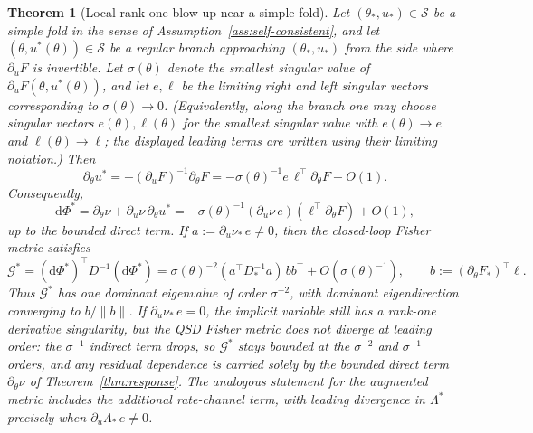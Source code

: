 \documentclass[11pt,reqno]{amsart}
\theoremstyle{plain}
\newtheorem{theorem}{Theorem}[section]
\theoremstyle{definition}
\theoremstyle{remark}
\newcommand{\dd}{\mathrm{d}}
\begin{document}
\begin{theorem}[Local rank-one blow-up near a simple fold]\label{thm:fold}
Let $(\theta_*,u_*)\in\mathcal S$ be a simple fold in the sense of
Assumption~\ref{ass:self-consistent}, and let $(\theta,u^{*}(\theta))\in\mathcal S$
be a regular branch approaching $(\theta_*,u_*)$ from the side where $\partial_uF$
is invertible. Let $\sigma(\theta)$ denote the smallest singular value of
$\partial_uF(\theta,u^{*}(\theta))$, and let $e,\ell$ be the limiting right and left
singular vectors corresponding to $\sigma(\theta)\to0$. \textup{(}Equivalently,
along the branch one may choose singular vectors $e(\theta),\ell(\theta)$ for the
smallest singular value with $e(\theta)\to e$ and $\ell(\theta)\to\ell$; the
displayed leading terms are written using their limiting notation.\textup{)} Then
\[
\partial_\theta u^{*}
=
-(\partial_uF)^{-1}\partial_\theta F
=
-\sigma(\theta)^{-1}e\,\ell^{\top}\partial_\theta F+O(1).
\]
Consequently,
\begin{equation}\label{eq:closed-loop}
\dd\Phi^{*}
=
\partial_\theta\nu+\partial_u\nu\,\partial_\theta u^{*}
=
-\sigma(\theta)^{-1}(\partial_u\nu\,e)(\ell^{\top}\partial_\theta F)+O(1),
\end{equation}
up to the bounded direct term. If $a:=\partial_u\nu_*\,e\neq0$, then the closed-loop
Fisher metric satisfies
\[
\mathcal G^{*}
=
(\dd\Phi^{*})^{\top}D^{-1}(\dd\Phi^{*})
=
\sigma(\theta)^{-2}(a^{\top}D_*^{-1}a)\,bb^{\top}+O(\sigma(\theta)^{-1}),
\qquad
b:=(\partial_\theta F_*)^{\top}\ell.
\]
Thus $\mathcal G^{*}$ has one dominant eigenvalue of order $\sigma^{-2}$, with
dominant eigendirection converging to $b/\|b\|$. If $\partial_u\nu_*\,e=0$, the
implicit variable still has a rank-one derivative singularity, but the QSD Fisher
metric does not diverge at leading order: the $\sigma^{-1}$ indirect term drops, so
$\mathcal G^{*}$ stays bounded at the $\sigma^{-2}$ and $\sigma^{-1}$ orders, and any residual
dependence is carried solely by the bounded direct term $\partial_\theta\nu$ of
Theorem~\ref{thm:response}. The analogous statement for the augmented
metric includes the additional rate-channel term, with leading divergence in
$\Lambda^{*}$ precisely when $\partial_u\Lambda_*\,e\neq0$.
\end{theorem}
\end{document}

